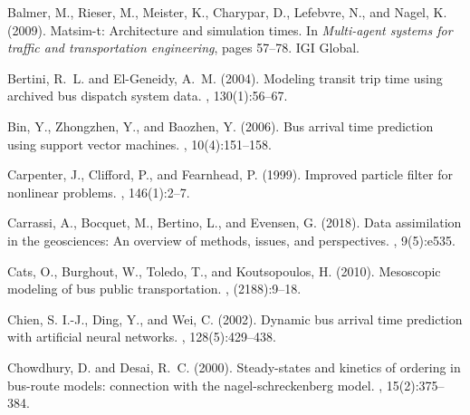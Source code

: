 \documentclass[11pt]{article}
\begin{document}

\begin{thebibliography}{}

Balmer, M., Rieser, M., Meister, K., Charypar, D., Lefebvre, N., and Nagel, K.
  (2009).
\newblock Matsim-t: Architecture and simulation times.
\newblock In {\em Multi-agent systems for traffic and transportation
  engineering}, pages 57--78. IGI Global.

Bertini, R.~L. and El-Geneidy, A.~M. (2004).
\newblock Modeling transit trip time using archived bus dispatch system data.
, 130(1):56--67.

Bin, Y., Zhongzhen, Y., and Baozhen, Y. (2006).
\newblock Bus arrival time prediction using support vector machines.
, 10(4):151--158.

Carpenter, J., Clifford, P., and Fearnhead, P. (1999).
\newblock Improved particle filter for nonlinear problems.
, 146(1):2--7.

Carrassi, A., Bocquet, M., Bertino, L., and Evensen, G. (2018).
\newblock Data assimilation in the geosciences: {{An}} overview of methods,
  issues, and perspectives.
, 9(5):e535.

Cats, O., Burghout, W., Toledo, T., and Koutsopoulos, H. (2010).
\newblock Mesoscopic modeling of bus public transportation.
, (2188):9--18.

Chien, S. I.-J., Ding, Y., and Wei, C. (2002).
\newblock Dynamic bus arrival time prediction with artificial neural networks.
, 128(5):429--438.

Chowdhury, D. and Desai, R.~C. (2000).
\newblock Steady-states and kinetics of ordering in bus-route models:
  connection with the nagel-schreckenberg model.
, 15(2):375--384.


\end{thebibliography}
\end{document}
